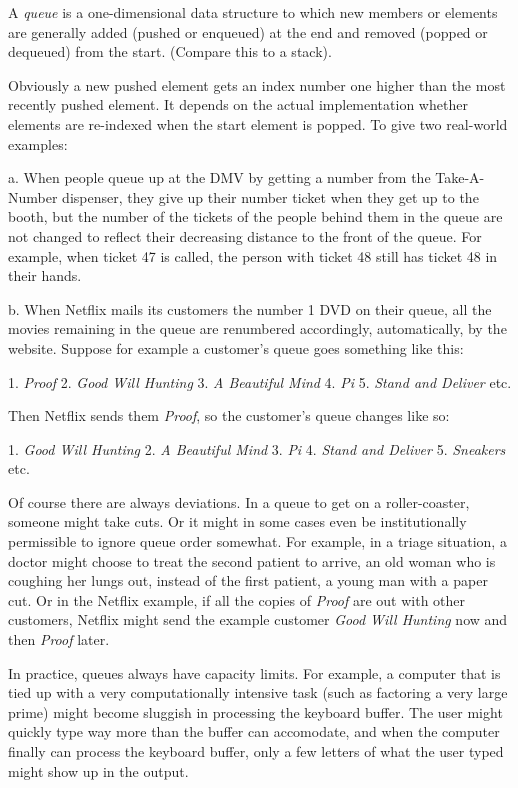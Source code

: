 \documentclass[12pt]{article}
\begin{document}
A \emph{queue} is a one-dimensional data structure to which new members or elements are generally added (pushed or enqueued) at the end and removed (popped or dequeued) from the start. (Compare this to a stack).

Obviously a new pushed element gets an index number one higher than the most recently pushed element. It depends on the actual implementation whether elements are re-indexed when the start element is popped. To give two real-world examples:

a. When people queue up at the DMV by getting a number from the Take-A-Number dispenser, they give up their number ticket when they get up to the booth, but the number of the tickets of the people behind them in the queue are not changed to reflect their decreasing distance to the front of the queue. For example, when ticket 47 is called, the person with ticket 48 still has ticket 48 in their hands.

b. When Netflix mails its customers the number 1 DVD on their queue, all the movies remaining in the queue are renumbered accordingly, automatically, by the website. Suppose for example a customer's queue goes something like this:

1. {\it Proof}
2. {\it Good Will Hunting}
3. {\it A Beautiful Mind}
4. {\it Pi}
5. {\it Stand and Deliver}
etc.

Then Netflix sends them {\it Proof}, so the customer's queue changes like so:

1. {\it Good Will Hunting}
2. {\it A Beautiful Mind}
3. {\it Pi}
4. {\it Stand and Deliver}
5. {\it Sneakers}
etc.

Of course there are always deviations. In a queue to get on a roller-coaster, someone might take cuts. Or it might in some cases even be institutionally permissible to ignore queue order somewhat. For example, in a triage situation, a doctor might choose to treat the second patient to arrive, an old woman who is coughing her lungs out, instead of the first patient, a young man with a paper cut. Or in the Netflix example, if all the copies of {\it Proof} are out with other customers, Netflix might send the example customer {\it Good Will Hunting} now and then {\it Proof} later.

In practice, queues always have capacity limits. For example, a computer that is tied up with a very computationally intensive task (such as factoring a very large prime) might become sluggish in processing the keyboard buffer. The user might quickly type way more than the buffer can accomodate, and when the computer finally can process the keyboard buffer, only a few letters of what the user typed might show up in the output.
\end{document}
